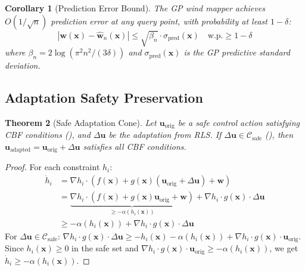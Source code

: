 \documentclass[12pt,a4paper,twocolumn]{article}
\newcommand{\cC}{\mathcal{C}}
\newcommand{\vect}[1]{\mathbf{#1}}
\newtheorem{theorem}{Theorem}[section]
\newtheorem{corollary}[theorem]{Corollary}
\begin{document}
\begin{corollary}[Prediction Error Bound]
\label{cor:gp_pred}
The GP wind mapper achieves $O(1/\sqrt{n})$ prediction error at any query point, with probability at least $1 - \delta$:
\begin{equation}
    |\vect{w}(\vect{x}) - \hat{\vect{w}}_n(\vect{x})| \leq \sqrt{\beta_n} \cdot \sigma_{\text{pred}}(\vect{x}) \quad \text{w.p.} \geq 1 - \delta
\end{equation}
where $\beta_n = 2\log(\pi^2 n^2 / (3\delta))$ and $\sigma_{\text{pred}}(\vect{x})$ is the GP predictive standard deviation.
\end{corollary}

\subsection{Adaptation Safety Preservation}

\begin{theorem}[Safe Adaptation Cone]
\label{thm:safe_cone}
Let $\vect{u}_{\text{orig}}$ be a safe control action satisfying CBF conditions (), and $\Delta\vect{u}$ be the adaptation from RLS. If $\Delta\vect{u} \in \cC_{\text{safe}}$ (), then $\vect{u}_{\text{adapted}} = \vect{u}_{\text{orig}} + \Delta\vect{u}$ satisfies all CBF conditions.
\end{theorem}

\begin{proof}
For each constraint $h_i$:
\begin{align}
    \dot{h}_i &= \nabla h_i \cdot (f(\vect{x}) + g(\vect{x})(\vect{u}_{\text{orig}} + \Delta\vect{u}) + \vect{w}) \\
    &= \underbrace{\nabla h_i \cdot (f(\vect{x}) + g(\vect{x})\vect{u}_{\text{orig}} + \vect{w})}_{\geq -\alpha(h_i(\vect{x}))} + \nabla h_i \cdot g(\vect{x}) \cdot \Delta\vect{u} \\
    &\geq -\alpha(h_i(\vect{x})) + \nabla h_i \cdot g(\vect{x}) \cdot \Delta\vect{u}
\end{align}
For $\Delta\vect{u} \in \cC_{\text{safe}}$: $\nabla h_i \cdot g(\vect{x}) \cdot \Delta\vect{u} \geq -h_i(\vect{x}) - \alpha(h_i(\vect{x})) + \nabla h_i \cdot g(\vect{x}) \cdot \vect{u}_{\text{orig}}$. Since $h_i(\vect{x}) \geq 0$ in the safe set and $\nabla h_i \cdot g(\vect{x}) \cdot \vect{u}_{\text{orig}} \geq -\alpha(h_i(\vect{x}))$, we get $\dot{h}_i \geq -\alpha(h_i(\vect{x}))$.
\end{proof}
\end{document}
